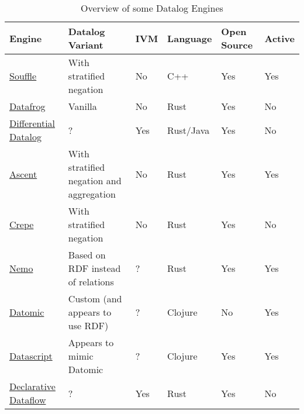 \documentclass{article}
\begin{document}
\begin{table*}[]
	\center
	\small
	\begin{tabular}{@{}lp{3.4cm}lp{1.2cm}p{0.7cm}l@{}}
		\toprule
		Engine                                                                      & Datalog Variant                          & IVM & Language  & Open Source & Active \\
		\midrule
		\href{https://github.com/souffle-lang/souffle}{Souffle}                     & With stratified negation                 & No  & C++       & Yes         & Yes    \\
		\href{https://github.com/rust-lang/datafrog}{Datafrog}                      & Vanilla                                  & No  & Rust      & Yes         & No     \\
		\href{https://github.com/vmware/differential-datalog}{Differential Datalog} & ?                                        & Yes & Rust/Java & Yes         & No     \\
		\href{https://github.com/s-arash/ascent/}{Ascent}                           & With stratified negation and aggregation & No  & Rust      & Yes         & Yes    \\
		\href{https://github.com/ekzhang/crepe}{Crepe}                              & With stratified negation                 & No  & Rust      & Yes         & No     \\
		\href{https://github.com/knowsys/nemo}{Nemo}                                & Based on RDF instead of relations        & ?   & Rust      & Yes         & Yes    \\
		\href{https://www.datomic.com}{Datomic}                                     & Custom (and appears to use RDF)          & ?   & Clojure   & No          & Yes    \\
		\href{https://github.com/tonsky/datascript}{Datascript}                     & Appears to mimic Datomic                 & ?   & Clojure   & Yes         & Yes    \\
		\href{https://github.com/comnik/declarative-dataflow}{Declarative Dataflow} & ?                                        & Yes & Rust      & Yes         & No     \\
		\bottomrule
	\end{tabular}
	\caption{Overview of some Datalog Engines}
	\label{tab:datalog-engines}
\end{table*}

\pagebreak{}
\printbibliography{}
\end{document}
